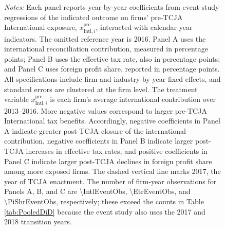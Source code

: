\documentclass[11pt,letterpaper]{article}
\newcommand{\CountNum}[1]{\num[round-mode=places,round-precision=0]{#1}}
\begin{document}
\begin{figure}[!tp]

  \bigskip
  \begin{minipage}{0.95\textwidth}
  \footnotesize
\textit{Notes:} Each panel reports year-by-year coefficients from event-study regressions of the
  indicated outcome on firms' pre-TCJA International exposure, $\bar x^{\text{pre}}
  _{\text{Intl},i}$, interacted with calendar-year indicators. The omitted reference year is 2016.
  Panel A uses the international reconciliation contribution, measured in percentage points; Panel B
  uses the effective tax rate, also in percentage points; and Panel C uses foreign profit share,
  reported in percentage points. All specifications include firm and industry-by-year fixed effects,
  and standard errors are clustered at the firm level. The treatment variable $\bar x^{\text{pre}}
  _{\text{Intl},i}$ is each firm's average international contribution over 2013--2016. More negative
  values correspond to larger pre-TCJA International tax benefits. Accordingly, negative
  coefficients in Panel A indicate greater post-TCJA closure of the international contribution, negative
  coefficients in Panel B indicate larger post-TCJA increases in effective tax rates, and positive
  coefficients in Panel C indicate larger post-TCJA declines in foreign profit share among more
  exposed firms. The dashed vertical line marks 2017, the year of TCJA enactment. The number of
  firm-year observations for Panels A, B, and C are \CountNum{\IntlEventObs},
  \CountNum{\EtrEventObs}, and \CountNum{\PiShrEventObs}, respectively; these
  exceed the counts in Table \ref{tab:PooledDiD} because the event study also
  uses the 2017 and 2018 transition years.
  \end{minipage}

  \bigskip
  \bigskip

\end{figure}
\end{document}
